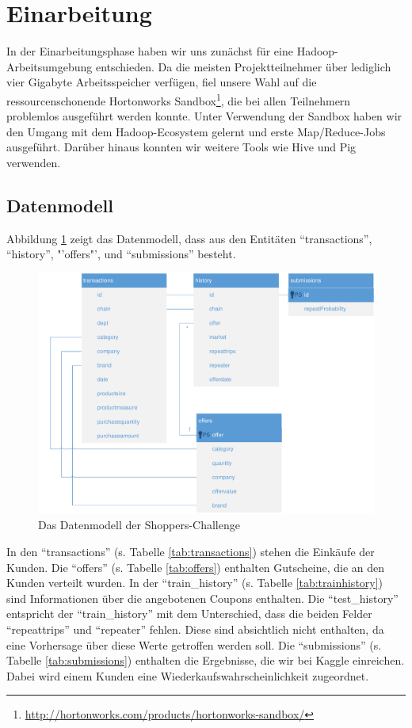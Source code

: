 \section{Einarbeitung}
In der Einarbeitungsphase haben wir uns zunächst für eine Hadoop-Arbeitsumgebung entschieden. Da die meisten Projektteilnehmer über lediglich vier Gigabyte Arbeitsspeicher verfügen, fiel unsere Wahl auf die ressourcenschonende Hortonworks Sandbox\footnote{\url{http://hortonworks.com/products/hortonworks-sandbox/}}, die bei allen Teilnehmern problemlos ausgeführt werden konnte. Unter Verwendung der Sandbox haben wir den Umgang mit dem Hadoop-Ecosystem gelernt und erste Map/Reduce-Jobs ausgeführt. Darüber hinaus konnten wir weitere Tools wie Hive und Pig verwenden.

\renewcommand{\arraystretch}{1.3}

\subsection{Datenmodell}
Abbildung \ref{fig:ShoppersTables} zeigt das Datenmodell, dass aus den Entitäten "`transactions"', "`history"', "'offers"', und "`submissions"' besteht. 

\begin{figure}[h]
\centering
\includegraphics[width=1\linewidth]{Bilder/ShoppersTables}
\caption{Das Datenmodell der Shoppers-Challenge}
\label{fig:ShoppersTables}
\end{figure}

In den "`transactions"' (s. Tabelle \ref{tab:transactions}) stehen die Einkäufe der Kunden.
Die "`offers"' (s. Tabelle \ref{tab:offers}) enthalten Gutscheine, die an den Kunden verteilt wurden.
In der "`train\_history"' (s. Tabelle \ref{tab:trainhistory}) sind Informationen über die angebotenen Coupons enthalten.
Die "`test\_history"' entspricht der "`train\_history"' mit dem Unterschied, dass die beiden Felder "`repeattrips"' und "`repeater"' fehlen. Diese sind absichtlich nicht enthalten, da eine Vorhersage über diese Werte getroffen werden soll.
Die "`submissions"' (s. Tabelle \ref{tab:submissions}) enthalten die Ergebnisse, die wir bei Kaggle einreichen. Dabei wird einem Kunden eine Wiederkaufswahrscheinlichkeit zugeordnet.

